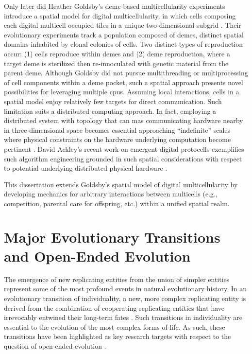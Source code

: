 Only later did Heather Goldsby's deme-based multicellularity experiments introduce a spatial model for digital multicellularity, in which cells composing each digital multicell occupied tiles in a unique two-dimensional subgrid \citep{goldsby2014evolutionary}.
Their evolutionary experiments track a population composed of demes, distinct spatial domains inhabited by clonal colonies of cells.
Two distinct types of reproduction occur: (1) cells reproduce within demes and (2) deme reproduction, where a target deme is sterilized then re-innoculated with genetic material from the parent deme.
Although Goldsby did not pursue multithreading or multiprocessing of cell components within a deme pocket, such a spatial approach presents novel possibilities for leveraging multiple cpus.
Assuming local interactions, cells in a spatial model enjoy relatively few targets for direct communication.
Such limitation suits a distributed computing approach.
In fact, employing a distributed system with topology that can mas communicating hardware nearby in three-dimensional space becomes essential  approaching ``indefinite'' scales where physical constraints on the hardware underlying computation become pertinent \citep{ackley2011pursue}.
David Ackley's recent work on emergent digital protocells exemplifies such algorithm engineering grounded in such spatial considerations with respect to potential underlying distributed physical hardware \citep{ackley2018digital,ackley2019building}.

This dissertation extends Goldsby's spatial model of digital multicellularity by developing mechanics for arbitrary interactions between multicells (e.g., competition, parental care for offspring, etc.) within a unified spatial realm.

\section{Major Evolutionary Transitions and Open-Ended Evolution}

The emergence of new replicating entities from the union of simpler entities represent some of the most profound events in natural evolutionary history.
In an evolutionary transition of individuality, a new, more complex replicating entity is derived from the combination of cooperating replicating entities that have irrevocably entwined their long-term fates \citep{west2015major}.
Such transitions in individuality are essential to the evolution of the most complex forms of life.
As such, these transitions have been highlighted as key research targets with respect to the question of open-ended evolution \citep{ray1996evolving, banzhaf2016defining}.

